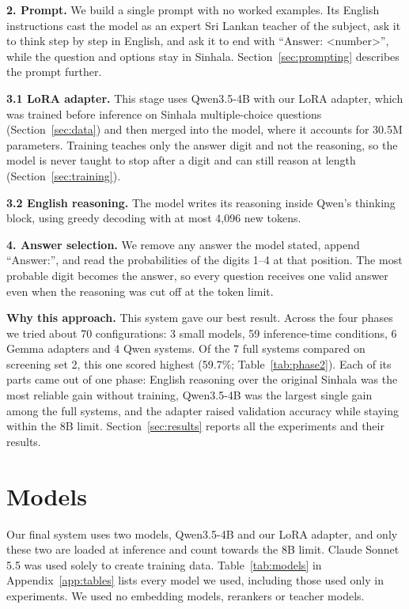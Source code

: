 \documentclass[11pt]{article}
\newcommand{\para}[1]{\smallskip\noindent\textbf{#1}\enspace}
\begin{document}
\para{2. Prompt.} We build a single prompt with no worked examples. Its English instructions cast the model as an expert Sri Lankan teacher of the subject, ask it to think step by step in English, and ask it to end with ``Answer: <number>'', while the question and options stay in Sinhala. Section~\ref{sec:prompting} describes the prompt further.

\para{3.1 LoRA adapter.} This stage uses Qwen3.5-4B with our LoRA adapter, which was trained before inference on Sinhala multiple-choice questions (Section~\ref{sec:data}) and then merged into the model, where it accounts for 30.5M parameters. Training teaches only the answer digit and not the reasoning, so the model is never taught to stop after a digit and can still reason at length (Section~\ref{sec:training}).

\para{3.2 English reasoning.} The model writes its reasoning inside Qwen's thinking block, using greedy decoding with at most 4,096 new tokens.

\para{4. Answer selection.} We remove any answer the model stated, append ``Answer:'', and read the probabilities of the digits 1--4 at that position. The most probable digit becomes the answer, so every question receives one valid answer even when the reasoning was cut off at the token limit.

\para{Why this approach.} This system gave our best result. Across the four phases we tried about 70 configurations: 3 small models, 59 inference-time conditions, 6 Gemma adapters and 4 Qwen systems. Of the 7 full systems compared on screening set 2, this one scored highest (59.7\%; Table~\ref{tab:phase2}). Each of its parts came out of one phase: English reasoning over the original Sinhala was the most reliable gain without training, Qwen3.5-4B was the largest single gain among the full systems, and the adapter raised validation accuracy while staying within the 8B limit. Section~\ref{sec:results} reports all the experiments and their results.

\section{Models}\label{sec:params}
Our final system uses two models, Qwen3.5-4B and our LoRA adapter, and only these two are loaded at inference and count towards the 8B limit. Claude Sonnet 5.5 was used solely to create training data. Table~\ref{tab:models} in Appendix~\ref{app:tables} lists every model we used, including those used only in experiments. We used no embedding models, rerankers or teacher models.
\end{document}
